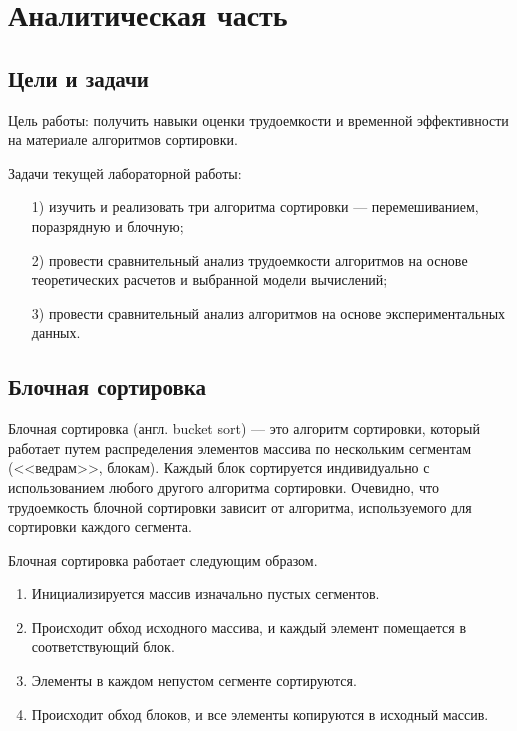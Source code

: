 \chapter{Аналитическая часть}

\section{Цели и задачи}

Цель работы: получить навыки оценки трудоемкости и временной эффективности на материале алгоритмов сортировки.

Задачи текущей лабораторной работы:

\begin{enumerate}
\item[1)]
изучить и реализовать три алгоритма сортировки --- перемешиванием, поразрядную и блочную;
\item[2)]
провести сравнительный анализ трудоемкости алгоритмов на основе теоретических расчетов и выбранной модели вычислений;
\item[3)]
провести сравнительный анализ алгоритмов на основе экспериментальных данных.
\end{enumerate}

\section{Блочная сортировка}

Блочная сортировка (англ. bucket sort) --- это алгоритм сортировки, который работает путем распределения элементов массива по нескольким сегментам (<<ведрам>>, блокам). 
Каждый блок сортируется индивидуально с использованием любого другого алгоритма сортировки. 
Очевидно, что трудоемкость блочной сортировки зависит от алгоритма, используемого для сортировки каждого сегмента.

Блочная сортировка работает следующим образом.

\begin{enumerate}
\item
Инициализируется массив изначально пустых сегментов.
\item
Происходит обход исходного массива, и каждый элемент помещается в соответствующий блок.
\item
Элементы в каждом непустом сегменте сортируются.
\item
Происходит обход блоков, и все элементы копируются в исходный массив.
\end{enumerate}

